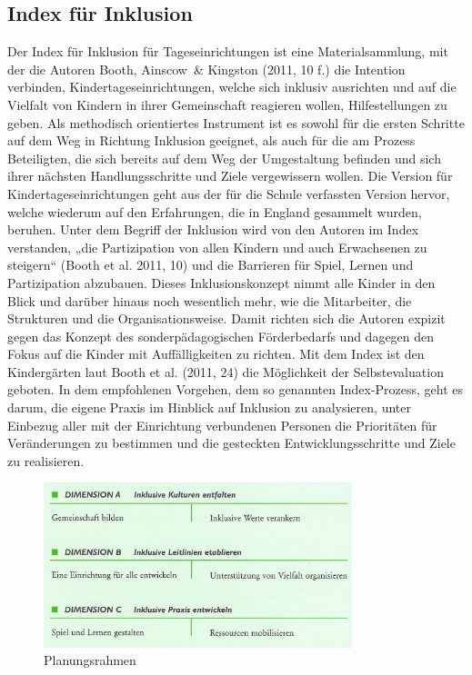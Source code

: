 \subsection{Index für Inklusion}
Der Index für Inklusion für Tageseinrichtungen ist eine Materialsammlung, mit der die Autoren Booth, Ainscow~\& Kingston (2011, 10 f.) die Intention verbinden, Kindertageseinrichtungen, welche sich inklusiv ausrichten und auf die Vielfalt von Kindern in ihrer Gemeinschaft reagieren wollen, Hilfestellungen zu geben. Als methodisch orientiertes Instrument ist es sowohl für die ersten Schritte auf dem Weg in Richtung Inklusion geeignet, als auch für die am Prozess Beteiligten, die sich bereits auf dem Weg der Umgestaltung befinden und sich ihrer nächsten Handlungsschritte und Ziele vergewissern wollen.
Die Version für Kindertageseinrichtungen geht aus der für die Schule verfassten Version hervor, welche wiederum auf den Erfahrungen, die in England gesammelt wurden, beruhen. Unter dem Begriff der Inklusion wird von den Autoren im Index verstanden, „die Partizipation von allen Kindern und auch Erwachsenen zu steigern“ (Booth et al. 2011, 10) und die Barrieren für Spiel, Lernen und Partizipation abzubauen. Dieses Inklusionskonzept nimmt alle Kinder in den Blick und darüber hinaus noch wesentlich mehr, wie die Mitarbeiter, die Strukturen und die Organisationsweise. Damit richten sich die Autoren expizit gegen das Konzept des sonderpädagogischen Förderbedarfs und dagegen den Fokus auf  die Kinder mit Auffälligkeiten zu richten.
Mit dem Index ist den Kindergärten laut Booth et al. (2011, 24) die Möglichkeit der Selbstevaluation geboten. In dem empfohlenen Vorgehen, dem so genannten Index-Prozess, geht es darum, die eigene Praxis im Hinblick auf Inklusion zu analysieren, unter Einbezug aller mit der Einrichtung verbundenen Personen die Prioritäten für Veränderungen zu bestimmen und die gesteckten Entwicklungsschritte und Ziele zu realisieren. 

\begin{figure}
  \centering
  \label{pic:planungsrahmen}
  \includegraphics[width=0.8\textwidth]{bilder/planungsrahmen}
  \caption{Planungsrahmen}
\end{figure}

